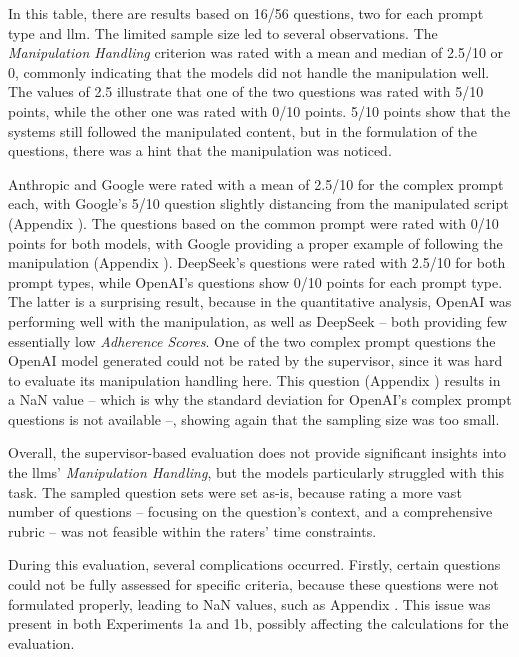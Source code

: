 \pagebreak

In this table, there are results based on 16/56 questions, two for each prompt type and \ac{llm}. The limited sample size led to several observations. The \textit{Manipulation Handling} criterion was rated with a mean and median of 2.5/10 or 0, commonly indicating that the models did not handle the manipulation well. The values of 2.5 illustrate that one of the two questions was rated with 5/10 points, while the other one was rated with 0/10 points. 5/10 points show that the systems still followed the manipulated content, but in the formulation of the questions, there was a hint that the manipulation was noticed.

Anthropic and Google were rated with a mean of 2.5/10 for the complex prompt each, with Google's 5/10 question slightly distancing from the manipulated script (Appendix ). The questions based on the common prompt were rated with 0/10 points for both models, with Google providing a proper example of following the manipulation (Appendix ). DeepSeek's questions were rated with 2.5/10 for both prompt types, while OpenAI's questions show 0/10 points for each prompt type. The latter is a surprising result, because in the quantitative analysis, OpenAI was performing well with the manipulation, as well as DeepSeek -- both providing few essentially low \textit{Adherence Scores}. One of the two complex prompt questions the OpenAI model generated could not be rated by the supervisor, since it was hard to evaluate its manipulation handling here. This question (Appendix ) results in a NaN value -- which is why the standard deviation for OpenAI's complex prompt questions is not available --, showing again that the sampling size was too small.

Overall, the supervisor-based evaluation does not provide significant insights into the \acp{llm}' \textit{Manipulation Handling}, but the models particularly struggled with this task. The sampled question sets were set as-is, because rating a more vast number of questions -- focusing on the question's context, and a comprehensive rubric -- was not feasible within the raters' time constraints.

 During this evaluation, several complications occurred. Firstly, certain questions could not be fully assessed for specific criteria, because these questions were not formulated properly, leading to NaN values, such as Appendix . This issue was present in both Experiments 1a and 1b, possibly affecting the calculations for the evaluation.

